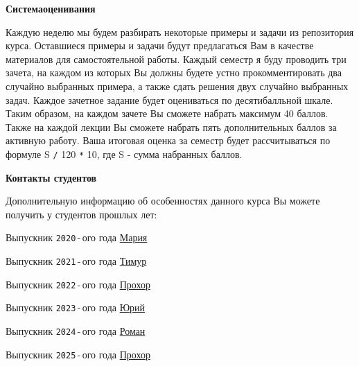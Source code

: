 \documentclass[a4paper,12pt]{article}
\renewenvironment{itemize}
{
    \begin{list}{\labelitemi}
    {
      \setlength{\topsep}{0pt}
      \setlength{\partopsep}{0pt}
      \setlength{\parskip}{0pt}
      \setlength{\itemsep}{0pt}
      \setlength{\parsep}{0pt}
      \setlength{\leftmargin}{14.5pt}
    }
}{\end{list}}
\begin{document}
\medskip
\medskip

\textbf{Система\:оценивания}

\medskip

Каждую неделю мы будем разбирать некоторые примеры и задачи из репозитория курса. Оставшиеся примеры и задачи будут предлагаться Вам в качестве материалов для самостоятельной работы. Каждый семестр я буду проводить три зачета, на каждом из которых Вы должны будете устно прокомментировать два случайно выбранных примера, а также сдать решения двух случайно выбранных задач. Каждое зачетное задание будет оцениваться по десятибалльной шкале. Таким образом, на каждом зачете Вы сможете набрать максимум 40 баллов. Также на каждой лекции Вы сможете набрать пять дополнительных баллов за активную работу. Ваша итоговая оценка за семестр будет рассчитываться по формуле S \texttt{/} 120 \texttt{*} 10, где S - сумма набранных баллов.

\medskip
\medskip

\textbf{Контакты студентов}

\medskip

Дополнительную информацию об особенностях данного курса Вы можете получить у студентов прошлых лет:

\medskip

\begin{itemize}

    \item Выпускник \texttt{2020}\,-\,ого года \href{https://t.me/makovka2000}{Мария}

    \smallskip

    \item Выпускник \texttt{2021}\,-\,ого года \href{https://t.me/TF0801}{Тимур}

    \smallskip

    \item Выпускник \texttt{2022}\,-\,ого года \href{https://t.me/Funny_ded}{Прохор}

    \smallskip

    \item Выпускник \texttt{2023}\,-\,ого года \href{https://t.me/YuriKashpur}{Юрий}

    \smallskip

    \item Выпускник \texttt{2024}\,-\,ого года \href{https://t.me/Yeah_That_Fits}{Роман} 

    \smallskip

    \item Выпускник \texttt{2025}\,-\,ого года \href{https://t.me/Funny_ded}{Прохор}

\end{itemize}
\end{document}
